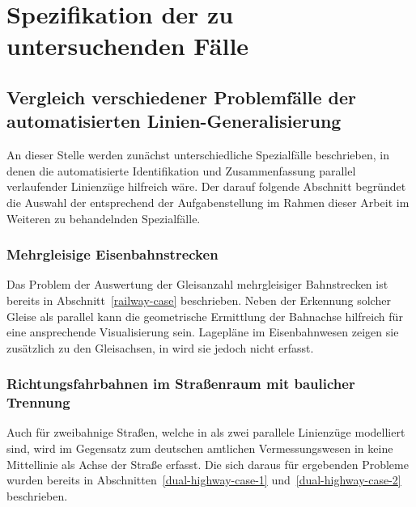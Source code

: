 \documentclass[../main/thesis.tex]{subfiles}
\begin{document}
\chapter{Spezifikation der zu untersuchenden Fälle}



\section{Vergleich verschiedener Problemfälle der automatisierten Linien-Generalisierung}


An dieser Stelle werden zunächst unterschiedliche Spezialfälle beschrieben, in denen die automatisierte Identifikation und Zusammenfassung parallel verlaufender Linienzüge hilfreich wäre.
Der darauf folgende Abschnitt begründet die Auswahl der entsprechend der Aufgabenstellung im Rahmen dieser Arbeit im Weiteren zu behandelnden Spezialfälle.


\subsection{Mehrgleisige Eisenbahnstrecken}

Das Problem der Auswertung der Gleisanzahl mehrgleisiger Bahnstrecken ist bereits in Abschnitt~\ref{railway-case} beschrieben.
Neben der Erkennung solcher Gleise als parallel kann die geometrische Ermittlung der Bahnachse hilfreich für eine ansprechende Visualisierung sein.
Lagepläne im Eisenbahnwesen zeigen sie zusätzlich zu den Gleisachsen, in \osm{} wird sie jedoch nicht erfasst.



\subsection{Richtungsfahrbahnen im Straßenraum mit baulicher Trennung}
\label{dual-highway-case-desc}

Auch für zweibahnige Straßen, welche in \osm{} als zwei parallele Linienzüge modelliert sind, wird im Gegensatz zum deutschen amtlichen Vermessungswesen  in \osm{} keine Mittellinie als Achse der Straße erfasst.
Die sich daraus für \osm{} ergebenden Probleme wurden bereits in Abschnitten~\ref{dual-highway-case-1} und~\ref{dual-highway-case-2} beschrieben.
\end{document}
